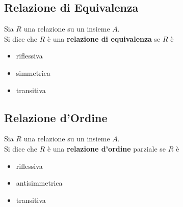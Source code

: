 \documentclass[a4paper,12pt, oneside]{book}
\begin{document}
		\subsection{Relazione di Equivalenza}
		\begin{definizione}
			Sia $R$ una relazione su un insieme $A$.\\
			Si dice che $R$ è una \textbf{relazione di equivalenza} se $R$ è
			\begin{itemize}
				\item riflessiva
				\item simmetrica
				\item transitiva
			\end{itemize}
		\end{definizione}
		\subsection{Relazione d'Ordine}
		\begin{definizione}
			Sia $R$ una relazione su un insieme $A$.\\
			Si dice che $R$ è una \textbf{relazione d'ordine} parziale se $R$ è
			\begin{itemize}
				\item riflessiva
				\item antisimmetrica
				\item transitiva
			\end{itemize}
		\end{definizione}
\end{document}
